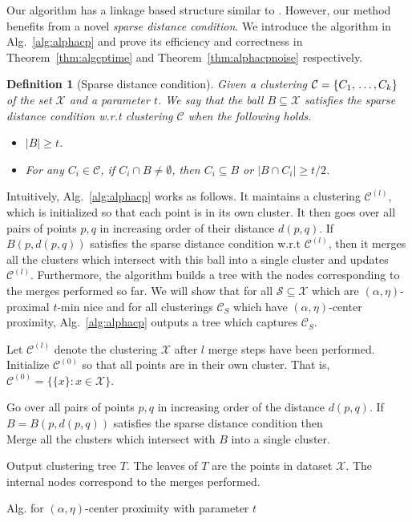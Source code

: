 \documentclass[letterpaper,12pt,titlepage,oneside,final]{book}
\newtheorem{definition}{Definition}
\newcommand{\mc}{\mathcal}
\begin{document}
Our algorithm has a linkage based structure similar to \cite{balcan2012clustering}. However, our method benefits from a novel {\it sparse distance condition}. We introduce the algorithm in Alg.~\ref{alg:alphacp} and prove its efficiency and correctness in Theorem~\ref{thm:algcptime} and Theorem~\ref{thm:alphacpnoise} respectively. 

\begin{definition}[Sparse distance condition]
	 Given a clustering $\mc C = \{C_1,\\\ldots,C_k\}$ of the set $\mc X$ and a parameter $t$. We say that the ball $B \subseteq \mc X$ satisfies the sparse distance condition w.r.t clustering $\mc C$ when the following holds.
	 
\begin{itemize}
\item $|B| \ge t$.
\item For any $C_i \in \mc C$, if $C_i \cap B \neq \emptyset$, then $C_i \subseteq B$ or $|B \cap C_i| \ge t/2$.
\end{itemize}
\end{definition}

Intuitively, Alg.~\ref{alg:alphacp} works as follows. It maintains a clustering $\mc C^{(l)}$, which is initialized so that each point is in its own cluster. It then goes over all pairs of points $p, q$ in increasing order of their distance $d(p, q)$. If $B(p, d(p,q))$ satisfies the sparse distance condition w.r.t $\mc C^{(l)}$, then it merges all the clusters which intersect with this ball into a single cluster and updates $\mc C^{(l)}$. Furthermore, the algorithm builds a tree with the nodes corresponding to the merges performed so far. We will show that for all $\mc S \subseteq \mc X$ which are $(\alpha, \eta)$-proximal $t$-min nice and for all clusterings $\mc C_S$ which have $(\alpha, \eta)$-center proximity, Alg.~\ref{alg:alphacp} outputs a tree which captures $\mc C_S$.

\begin{algorithm}
	\SetAlgoLined
	\KwIn{$(\mc X, d)$ and $t$}
	\KwOut{A hierarchical clustering tree $T$ of $\mc X$.}
	
\vspace{0.1in}Let $\mc C^{(l)}$ denote the clustering $\mc X$ after $l$ merge steps have been performed. Initialize $\mc C^{(0)}$ so that all points are in their own cluster. That is, $\mc C^{(0)} = \{ \{x\}: x \in \mc X\}$.
	
	Go over all pairs of points $p, q$ in increasing order of the distance $d(p, q)$. If $B = B(p, d(p, q))$ satisfies the sparse distance condition then\\
	\hspace{0.24in}Merge all the clusters which intersect with $B$ into a single cluster.
	
	\vspace{0.1in}Output clustering tree $T$. The leaves of $T$ are the points in dataset $\mc X$. The internal nodes correspond to the merges performed.
\caption{Alg. for $(\alpha, \eta)$-center proximity with parameter $t$}	
\label{alg:alphacp}
\end{algorithm}
\end{document}
